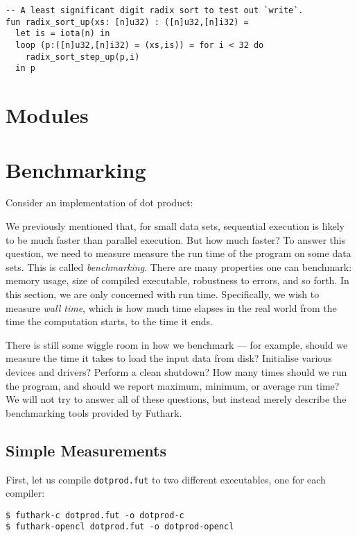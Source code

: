 \documentclass[oneside,11pt]{book}
\begin{document}
\begin{lstlisting}
-- A least significant digit radix sort to test out `write`.
fun radix_sort_up(xs: [n]u32) : ([n]u32,[n]i32) =
  let is = iota(n) in
  loop (p:([n]u32,[n]i32) = (xs,is)) = for i < 32 do
    radix_sort_step_up(p,i)
  in p
\end{lstlisting}


\section{Modules}
\label{sec:modules}

\section{Benchmarking}
\label{sec:benchmarking}

Consider an implementation of dot product:



We previously mentioned that, for small data sets, sequential
execution is likely to be much faster than parallel execution.  But
how much faster?  To answer this question, we need to measure measure
the run time of the program on some data sets.  This is called
\textit{benchmarking}.  There are many properties one can benchmark:
memory usage, size of compiled executable, robustness to errors, and
so forth.  In this section, we are only concerned with run time.
Specifically, we wish to measure \textit{wall time}, which is how much
time elapses in the real world from the time the computation starts,
to the time it ends.

There is still some wiggle room in how we benchmark --- for example,
should we measure the time it takes to load the input data from disk?
Initialise various devices and drivers?  Perform a clean shutdown?
How many times should we run the program, and should we report
maximum, minimum, or average run time?  We will not try to answer all
of these questions, but instead merely describe the benchmarking tools
provided by Futhark.

\subsection{Simple Measurements}

First, let us compile \texttt{dotprod.fut} to two different
executables, one for each compiler:

\begin{verbatim}
$ futhark-c dotprod.fut -o dotprod-c
$ futhark-opencl dotprod.fut -o dotprod-opencl
\end{verbatim}
\end{document}
